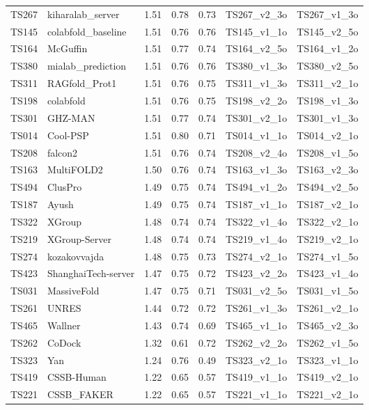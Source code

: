 \begin{longtable}{lllllll}
TS267 & kiharalab\_server & 1.51 & 0.78 & 0.73 & TS267\_v2\_3o & TS267\_v1\_3o \\ 
TS145 & colabfold\_baseline & 1.51 & 0.76 & 0.76 & TS145\_v1\_1o & TS145\_v2\_5o \\ 
TS164 & McGuffin & 1.51 & 0.77 & 0.74 & TS164\_v2\_5o & TS164\_v1\_2o \\ 
TS380 & mialab\_prediction & 1.51 & 0.76 & 0.76 & TS380\_v1\_3o & TS380\_v2\_5o \\ 
TS311 & RAGfold\_Prot1 & 1.51 & 0.76 & 0.75 & TS311\_v1\_3o & TS311\_v2\_1o \\ 
TS198 & colabfold & 1.51 & 0.76 & 0.75 & TS198\_v2\_2o & TS198\_v1\_3o \\ 
TS301 & GHZ-MAN & 1.51 & 0.77 & 0.74 & TS301\_v2\_1o & TS301\_v1\_3o \\ 
TS014 & Cool-PSP & 1.51 & 0.80 & 0.71 & TS014\_v1\_1o & TS014\_v2\_1o \\ 
TS208 & falcon2 & 1.51 & 0.76 & 0.74 & TS208\_v2\_4o & TS208\_v1\_5o \\ 
TS163 & MultiFOLD2 & 1.50 & 0.76 & 0.74 & TS163\_v1\_3o & TS163\_v2\_3o \\ 
TS494 & ClusPro & 1.49 & 0.75 & 0.74 & TS494\_v1\_2o & TS494\_v2\_5o \\ 
TS187 & Ayush & 1.49 & 0.75 & 0.74 & TS187\_v1\_1o & TS187\_v2\_1o \\ 
TS322 & XGroup & 1.48 & 0.74 & 0.74 & TS322\_v1\_4o & TS322\_v2\_1o \\ 
TS219 & XGroup-Server & 1.48 & 0.74 & 0.74 & TS219\_v1\_4o & TS219\_v2\_1o \\ 
TS274 & kozakovvajda & 1.48 & 0.75 & 0.73 & TS274\_v2\_1o & TS274\_v1\_5o \\ 
TS423 & ShanghaiTech-server & 1.47 & 0.75 & 0.72 & TS423\_v2\_2o & TS423\_v1\_4o \\ 
TS031 & MassiveFold & 1.47 & 0.75 & 0.71 & TS031\_v2\_5o & TS031\_v1\_5o \\ 
TS261 & UNRES & 1.44 & 0.72 & 0.72 & TS261\_v1\_3o & TS261\_v2\_1o \\ 
TS465 & Wallner & 1.43 & 0.74 & 0.69 & TS465\_v1\_1o & TS465\_v2\_3o \\ 
TS262 & CoDock & 1.32 & 0.61 & 0.72 & TS262\_v2\_2o & TS262\_v1\_5o \\ 
TS323 & Yan & 1.24 & 0.76 & 0.49 & TS323\_v2\_1o & TS323\_v1\_1o \\ 
TS419 & CSSB-Human & 1.22 & 0.65 & 0.57 & TS419\_v1\_1o & TS419\_v2\_1o \\ 
TS221 & CSSB\_FAKER & 1.22 & 0.65 & 0.57 & TS221\_v1\_1o & TS221\_v2\_1o \\ 

\end{longtable}
